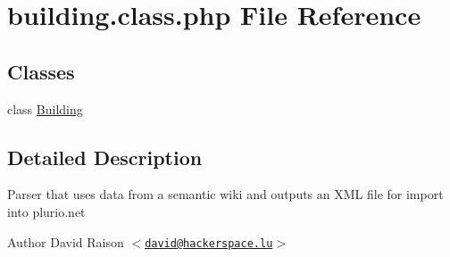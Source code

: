 \hypertarget{building_8class_8php}{
\section{building.class.php File Reference}
\label{building_8class_8php}
}
\subsection*{Classes}
\begin{DoxyCompactItemize}
\item 
class \hyperlink{classBuilding}{Building}
\end{DoxyCompactItemize}


\subsection{Detailed Description}
Parser that uses data from a semantic wiki and outputs an XML file for import into plurio.net

\begin{DoxyAuthor}{Author}
David Raison $<$\href{mailto:david@hackerspace.lu}{\tt david@hackerspace.lu}$>$ 
\end{DoxyAuthor}
